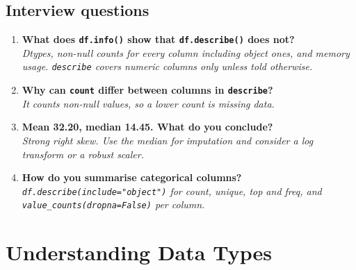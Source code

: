 \documentclass[11pt,a4paper]{article}
\begin{document}
\subsection*{Interview questions}

\begin{enumerate}\itemsep4pt
  \item \textbf{What does \lstinline|df.info()| show that \lstinline|df.describe()| does not?}\\
        \emph{Dtypes, non-null counts for every column including object ones, and memory
        usage. \lstinline|describe| covers numeric columns only unless told otherwise.}
  \item \textbf{Why can \lstinline|count| differ between columns in \lstinline|describe|?}\\
        \emph{It counts non-null values, so a lower count is missing data.}
  \item \textbf{Mean 32.20, median 14.45. What do you conclude?}\\
        \emph{Strong right skew. Use the median for imputation and consider a log transform
        or a robust scaler.}
  \item \textbf{How do you summarise categorical columns?}\\
        \emph{\lstinline|df.describe(include="object")| for count, unique, top and freq, and
        \lstinline|value_counts(dropna=False)| per column.}
\end{enumerate}

\newpage
\section{Understanding Data Types}


\end{document}
